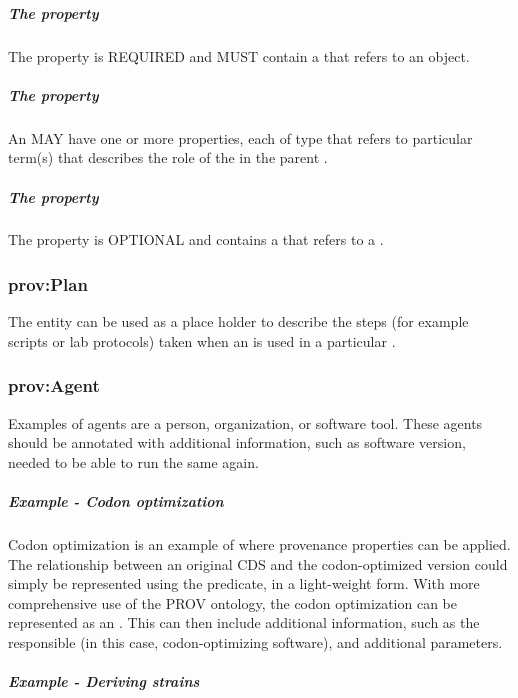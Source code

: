 \subparagraph{The  property}\label{sec:prov:agent}

The  property is REQUIRED and MUST contain a  that refers to an  object.

\subparagraph{The  property}\label{sec:prov:hadRole:A}

An  MAY have one or more  properties, each of type  that refers to particular term(s) that describes the role of the  in the parent .

\subparagraph{The  property}\label{sec:prov:hadPlan}

The  property is OPTIONAL and contains a  that refers to a .

\subsubsection{prov:Plan}
\label{sec:prov:Plan}

 The  entity can be used as a place holder to describe the steps (for example scripts or lab protocols) taken when an  is used in a particular .

\subsubsection{prov:Agent}
\label{sec:prov:Agent}

Examples of agents are a person, organization, or software tool.
These agents should be annotated with additional information, such as software version, needed to be able to run the same  again.

\subparagraph{Example - Codon optimization}

Codon optimization is an example of where provenance properties can be applied.
The relationship between an original CDS and the codon-optimized version could simply be represented using the  predicate, in a light-weight form. With more comprehensive use of the PROV ontology, the codon optimization can be represented as an . This  can then include additional information, such as the  responsible (in this case, codon-optimizing software), and additional parameters.

\subparagraph{Example - Deriving strains}

